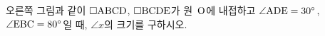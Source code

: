 \noindent\begin{minipage}[t]{0.58\linewidth}\vspace{0pt}\raggedright 오른쪽 그림과 같이 $\square\mathrm{ABCD}$, $\square\mathrm{BCDE}$가 원~$\mathrm{O}$에 내접하고 $\angle\mathrm{ADE}=30^\circ$, $\angle\mathrm{EBC}=80^\circ$일 때, $\angle x$의 크기를 구하시오.\end{minipage}\hfill\begin{minipage}[t]{0.4\linewidth}\vspace{0pt}\centering \resizebox{\ifdim\width>\linewidth\linewidth\else\width\fi}{!}{}\end{minipage}\par
